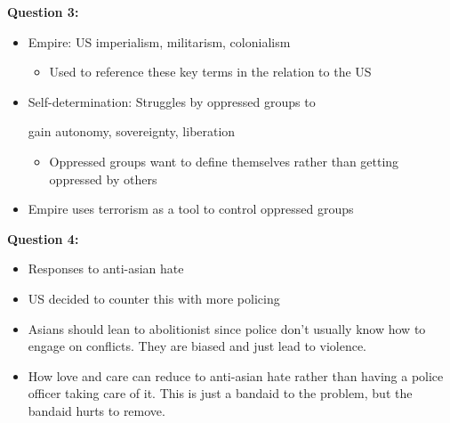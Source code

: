 \documentclass{article}
\begin{document}
\textbf{Question 3:}
\begin{itemize}
  \item Empire: US imperialism, militarism, colonialism
    \begin{itemize}
      \item Used to reference these key terms in the relation to the US
    \end{itemize}
  \item Self-determination: Struggles by oppressed groups to

    gain autonomy, sovereignty, liberation
    \begin{itemize}
      \item Oppressed groups want to define themselves rather than getting oppressed
        by others
    \end{itemize}
  \item Empire uses terrorism as a tool to control oppressed groups
\end{itemize}

\noindent \textbf{Question 4:}
\begin{itemize}
  \item Responses to anti-asian hate
  \item US decided to counter this with
    more policing
  \item Asians should lean to abolitionist since
    police don't usually know how to engage on conflicts.
    They are biased and just lead to violence.
  \item How love and care can reduce to anti-asian hate
    rather than having a police officer taking care of it.
    This is just a bandaid to the problem, but the
    bandaid hurts to remove.
\end{itemize}
\end{document}
